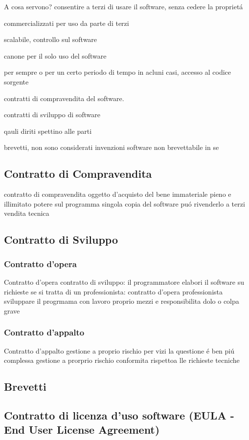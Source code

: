 \documentclass{article}
\begin{document}
A cosa servono? consentire a terzi di usare il software, senza cedere la propriet\'a

commercializzati per uso da parte di terzi

scalabile, controllo sul software

canone per il solo uso del software

per sempre o per un certo periodo di tempo
in acluni casi, accesso al codice sorgente

contratti di compravendita del software. 

contratti di sviluppo di software

qauli diriti spettino alle parti

brevetti, non sono considerati invenzioni
software non brevettabile in se 



\subsection{Contratto di Compravendita}
contratto di compravendita
oggetto d'acquisto del bene immateriale
pieno e illimitato potere sul programma
singola copia del software
pu\'o rivenderlo a terzi
vendita tecnica

\subsection{Contratto di Sviluppo}
\subsubsection{Contratto d'opera}
Contratto d'opera
contratto di sviluppo: il programmatore elabori il software su richieste
se si tratta di un professionista: contratto d'opera
professionista sviluppare il progrmama con lavoro proprio
mezzi e responsibilita dolo o colpa grave

\subsubsection{Contratto d'appalto}
Contratto d'appalto
gestione a proprio rischio
per vizi la questione \'e ben pi\'u complessa
gestione a prorprio rischio
conformita rispettoa lle richieste tecniche

\subsection{Brevetti}

\subsection{Contratto di licenza d'uso software (EULA - End User License Agreement)}
\end{document}
